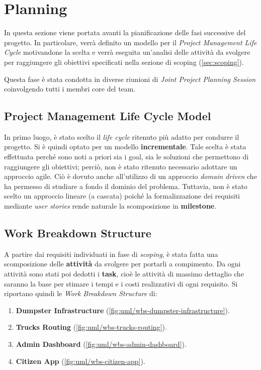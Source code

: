 \section{Planning}
\label{sec:planning}

In questa sezione viene portata avanti la pianificazione delle fasi successive del progetto. In particolare, verrà definito un modello per il \textit{Project Management Life Cycle} motivandone la scelta e verrà eseguita un'analisi delle attività da svolgere per raggiungere gli obiettivi specificati nella sezione di scoping (\ref{sec:scoping}).

Questa fase è stata condotta in diverse riunioni di \textit{Joint Project Planning Session} coinvolgendo tutti i membri core del team.

\subsection{Project Management Life Cycle Model}
In primo luogo, è stato scelto il \textit{life cycle} ritenuto più adatto per condurre il progetto. Si è quindi optato per un modello \textbf{incrementale}. Tale scelta è stata effettuata perché sono noti a priori sia i goal, sia le soluzioni che permettono di raggiungere gli obiettivi; perciò, non è stato ritenuto necessario adottare un approccio agile. Ciò è dovuto anche all'utilizzo di un approccio \textit{domain driven} che ha permesso di studiare a fondo il dominio del problema. Tuttavia, non è stato scelto un approccio lineare (a cascata) poiché la formalizzazione dei requisiti mediante \textit{user stories} rende naturale la scomposizione in \textbf{milestone}.

\subsection{Work Breakdown Structure}
A partire dai requisiti individuati in fase di \textit{scoping}, è stata fatta una scomposizione delle \textbf{attività} da svolgere per portarli a compimento. Da ogni attività sono stati poi dedotti i \textbf{task}, cioè le attività di massimo dettaglio che saranno la base per stimare i tempi e i costi realizzativi di ogni requisito.
Si riportano quindi le \textit{Work Breakdown Structure} di:
\begin{enumerate}
    \item \textbf{Dumpster Infrastructure} (\ref{fig:uml/wbs-dumpster-infrastructure}).
    \item \textbf{Trucks Routing} (\ref{fig:uml/wbs-trucks-routing}).
    \item \textbf{Admin Dashboard} (\ref{fig:uml/wbs-admin-dashboard}).
    \item \textbf{Citizen App} (\ref{fig:uml/wbs-citizen-app}).
\end{enumerate}